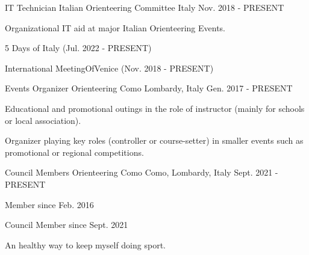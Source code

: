 

\begin{cventries}

  \cventry
  {IT Technician} %
  {Italian Orienteering Committee} %
  {Italy} %
  {Nov. 2018 - PRESENT} %
  {
    \begin{cvitems} %
      \item {Organizational IT aid at major Italian Orienteering Events.}
      \item {5 Days of Italy (Jul. 2022 - PRESENT)}
      \item {International MeetingOfVenice (Nov. 2018 - PRESENT)}
    \end{cvitems}
  }

  \cventry
  {Events Organizer} %
  {Orienteering Como} %
  {Lombardy, Italy} %
  {Gen. 2017 - PRESENT} %
  {
    \begin{cvitems} %
      \item {Educational and promotional outings in the role of instructor (mainly for schools or local association).}
      \item {Organizer playing key roles (controller or course-setter) in smaller events such as promotional or regional competitions.}
    \end{cvitems}
  }

  \cventry
  {Council Members} %
  {Orienteering Como} %
  {Como, Lombardy, Italy} %
  {Sept. 2021 - PRESENT} %
  {
    \begin{cvitems} %
      \item {Member since Feb. 2016}
      \item {Council Member since Sept. 2021}
      \item {An healthy way to keep myself doing sport.}
    \end{cvitems}
  }

\end{cventries}
